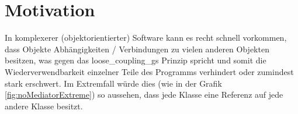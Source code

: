 \chapter{Motivation}\label{ref:motivation}
In komplexerer (objektorientierter) Software kann es recht schnell vorkommen, dass Objekte Abhängigkeiten / Verbindungen zu vielen anderen Objekten besitzen, was gegen das \glspl{loose_coupling_g} Prinzip spricht und somit die Wiederverwendbarkeit einzelner Teile des Programms verhindert oder zumindest stark erschwert. Im Extremfall würde dies (wie in der Grafik \ref{fig:noMediatorExtreme}) so aussehen, dass jede Klasse eine Referenz auf jede andere Klasse besitzt.
\autocite[vgl.][S. 273ff]{gangoffour_book}